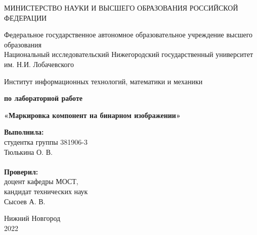 \documentclass[12pt]{article}
\begin{document}
\begin{titlepage}

\begin{center}
МИНИСТЕРСТВО НАУКИ И ВЫСШЕГО ОБРАЗОВАНИЯ РОССИЙСКОЙ ФЕДЕРАЦИИ 
\end{center}

\begin{center}
Федеральное государственное автономное образовательное учреждение высшего образования \\
Национальный исследовательский Нижегородский государственный университет им. Н.И. Лобачевского
\end{center}

\begin{center}
Институт информационных технологий, математики и механики
\end{center}

\vspace{4em}

\begin{center}
\textbf{ по лабораторной работе} \\
\end{center}

\begin{center}
\textbf{«Маркировка компонент на бинарном изображении»} \\
\end{center}

\vspace{4em}

\newbox{\lbox}
\newlength{\maxl}
\setlength{\maxl}{\wd\lbox}
\hfill\parbox{7cm}{
\hspace*{5cm}\hspace*{-5cm}\textbf{Выполнила:} \\ студентка группы 381906-3 \\ Тюлькина О. В. \\
\\
\hspace*{5cm}\hspace*{-5cm}\textbf{Проверил:}\\ доцент кафедры МОСТ, \\ кандидат технических наук \\ Сысоев А. В.\\
}
\vspace{\fill}

\begin{center} Нижний Новгород \\ 2022 \end{center}
\end{titlepage}
\end{document}
